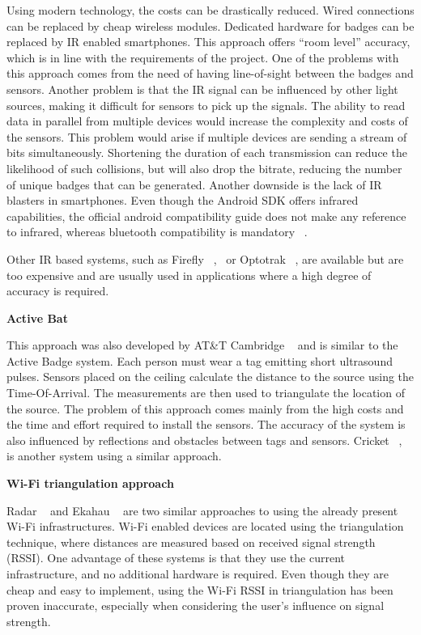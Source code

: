 Using modern technology, the costs can be drastically reduced. Wired connections can be replaced by cheap wireless modules. Dedicated hardware for badges can be replaced by IR enabled smartphones. This approach offers “room level” accuracy, which is in line with the requirements of the project. One of the problems with this approach comes from the need of having line-of-sight between the badges and sensors. Another problem is that the IR signal can be influenced by other light sources, making it difficult for sensors to pick up the signals. The ability to read data in parallel from multiple devices would increase the complexity and costs of the sensors. This problem would arise if multiple devices are sending a stream of bits simultaneously. Shortening the duration of each transmission can reduce the likelihood of such collisions, but will also drop the bitrate, reducing the number of unique badges that can be generated. Another downside is the lack of IR blasters in smartphones. Even though the Android SDK offers infrared capabilities, the official android compatibility guide does not make any reference to infrared, whereas bluetooth compatibility is mandatory ~\cite{AndroidCompat}.

Other IR based systems, such as Firefly ~\cite{Firefly1},~\cite{Firefly2} or Optotrak ~\cite{Optotrak}, are available but are too expensive and are usually used in applications where a high degree of accuracy is required. 

\medskip
\noindent \textbf{Active Bat}

This approach was also developed by AT\&T Cambridge ~\cite{ActiveBat} and is similar to the Active Badge system. Each person must wear a tag emitting short ultrasound pulses. Sensors placed on the ceiling calculate the distance to the source using the Time-Of-Arrival. The measurements are then used to triangulate the location of the source. The problem of this approach comes mainly from the high costs and the time and effort required to install the sensors. The accuracy of the system is also influenced by reflections and obstacles between tags and sensors. Cricket ~\cite{Priyantha1}, ~\cite{Priyantha2} is another system using a similar approach.

\medskip
\noindent \textbf{Wi-Fi triangulation approach}

Radar ~\cite{Bahl} and Ekahau ~\cite{Ekahau} are two similar approaches to using the already present Wi-Fi infrastructures. Wi-Fi enabled devices are located using the triangulation technique, where distances are measured based on received signal strength (RSSI). One advantage of these systems is that they use the current infrastructure, and no additional hardware is required. Even though they are cheap and easy to implement, using the Wi-Fi RSSI in triangulation has been proven inaccurate, especially when considering the user’s influence on signal strength. 

